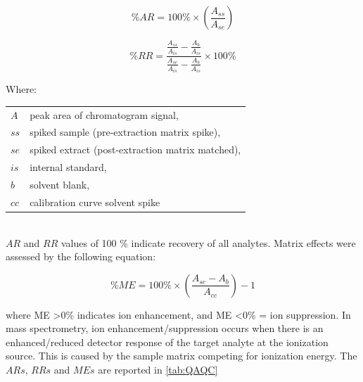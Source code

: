 \begin{equation}
    \label{eq:Recovery}
    \% AR  = 100 \% \times \left ( \frac{A_{ss}}{A_{se}} \right )
\end{equation}

\begin{equation}
    \label{eq:relativeRecovery}
    \% RR = \frac{\frac{A_{ss}}{A_{is}}-\frac{A_{b}}{A_{is}}}{\frac{A_{se}}{A_{is}}-\frac{A_{b}}{A_{is}}}\times 100 \% 
\end{equation}

Where: \newline
\newline
\begin{tabular}{p{1cm}p{20cm}}
    $A$   & peak area of chromatogram signal, \\
    $ss$  & spiked sample (pre-extraction matrix spike), \\
    $se$  & spiked extract (post-extraction matrix matched), \\
    $is$  & internal standard, \\
    $b$   & solvent blank, \\
    $cc$  & calibration curve solvent spike \\
\end{tabular} \\

$AR$ and $RR$ values of 100 \% indicate recovery of all analytes. Matrix effects were assessed by the following equation:

\begin{equation}
    \label{eq:ME}
    \% ME = 100 \% \times \left(\frac{A_{se} - A_b}{A_{cc}}\right )-1 
\end{equation}

where ME \textgreater 0\% indicates ion enhancement, and ME \textless 0\% = ion suppression. In mass spectrometry, ion enhancement/suppression occurs when there is an enhanced/reduced detector response of the target analyte at the ionization source. This is caused by the sample matrix competing for ionization energy. The $ARs$, $RRs$ and $MEs$ are reported in \cref{tab:QAQC}

